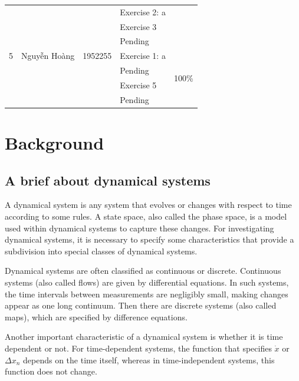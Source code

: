 \documentclass[a4paper]{article}
\begin{document}
\begin{center}
\begin{tabular}{llclc}
                 &                       &                     & Exercise 2: a     &                             \\
                 &                       &                     & Exercise 3        &                             \\
                 &                       &                     & Pending           &                             \\
    \midrule
    5            & Nguyễn Hoàng          & 1952255             & Exercise 1: a     & \multirow{4}{*}{100\%}      \\
                 &                       &                     & Pending           &                             \\
                 &                       &                     & Exercise 5        &                             \\
                 &                       &                     & Pending           &                             \\
    \bottomrule
  \end{tabular}
\end{center}


\newpage
\section{Background}
\subsection{A brief about dynamical systems}
A dynamical system is any system that evolves or changes with respect to time according to some rules.
A state space, also called the phase space, is a model used within dynamical systems to capture these changes.
For investigating dynamical systems, it is necessary to specify some characteristics that provide a subdivision into special classes of dynamical systems.

Dynamical systems are often classified as continuous or discrete.
Continuous systems (also called flows) are given by differential equations.
In such systems, the time intervals between measurements are negligibly small, making changes appear as one long continuum.
Then there are discrete systems (also called maps), which are specified by difference equations.

Another important characteristic of a dynamical system is whether it is time dependent or not.
For time-dependent systems, the function that specifies \(\dot{x}\) or \(\Delta{x_n}\) depends on the time itself, whereas in time-independent systems, this function does not change.
\end{document}
